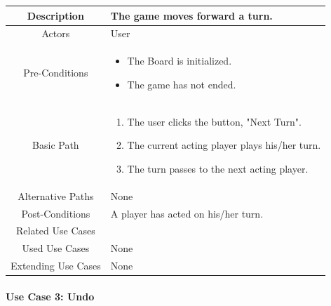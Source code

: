 \documentclass[10pt, a4paper]{article}
\begin{document}
	\begin{center}
		\begin{tabular}{ |c|p{10cm}| } 
			\hline
			Description & The game moves forward a turn. \\
			\hline 
			Actors & User \\
			\hline  
			Pre-Conditions & \begin{itemize}[noitemsep,topsep=0pt]
				\item The Board is initialized.
				\item The game has not ended.
			\end{itemize} \\
			\hline  
			Basic Path & 
			\begin{enumerate}
				\item The user clicks the button, "Next Turn".
				\item The current acting player plays his/her turn.
				\item The turn passes to the next acting player.
			\end{enumerate}\\
			\hline
			Alternative Paths & None \\
			\hline
			Post-Conditions & A player has acted on his/her turn.\\
			\hline 
			Related Use Cases & \\
			\hline 
			Used Use Cases & None\\
			\hline 
			Extending Use Cases & None \\
			\hline 
		\end{tabular}
	\end{center}
	
	\paragraph{Use Case 3: Undo}
	
\end{document}
